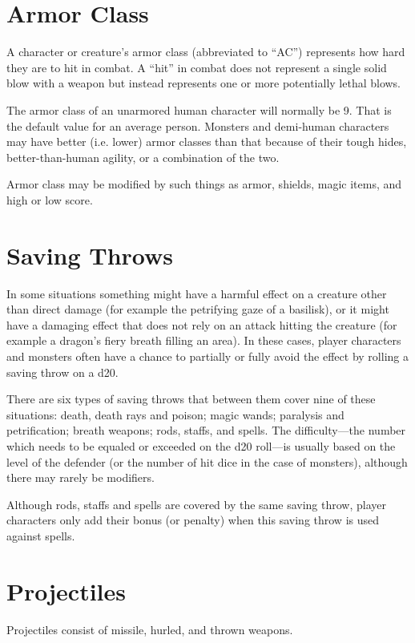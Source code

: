\begin{multicols*}{2}
\section{Armor Class}\label{sec:Armor Class}
A character or creature’s armor class (abbreviated to “AC”) represents how hard they are to hit in combat. A “hit” in combat does not represent a single solid blow with a weapon but instead represents one or more potentially lethal blows.

The armor class of an unarmored human character will normally be 9. That is the default value for an average person. Monsters and demi-human characters may have better (i.e. lower) armor classes than that because of their tough hides, better-than-human agility, or a combination of the two.

Armor class may be modified by such things as armor, shields, magic items, and high or low  score.

\section{Saving Throws}\label{sec:Saving Throws}
In some situations something might have a harmful effect on a creature other than direct damage (for example the petrifying gaze of a basilisk), or it might have a damaging effect that does not rely on an attack hitting the creature (for example a dragon’s fiery breath filling an area). In these cases, player characters and monsters often have a chance to partially or fully avoid the effect by rolling a saving throw on a d20.

There are six types of saving throws that between them cover nine of these situations: death, death rays and poison; magic wands; paralysis and petrification; breath weapons; rods, staffs, and spells. The difficulty—the number which needs to be equaled or exceeded on the d20 roll—is usually based on the level of the defender (or the number of hit dice in the case of monsters), although there may rarely be modifiers.

Although rods, staffs and spells are covered by the same saving throw, player characters only add their  bonus (or penalty) when this saving throw is used against spells.

\section{Projectiles}
Projectiles consist of missile, hurled, and thrown weapons.


\end{multicols*}
